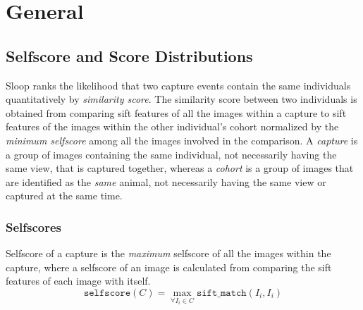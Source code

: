 \section{General}

\subsection{Selfscore and Score Distributions}

Sloop ranks the likelihood that two capture events contain the same individuals
quantitatively by \emph{similarity score}. The similarity score between two individuals is
obtained from comparing sift features of all the images within a capture to sift features of the images within the other individual's cohort
normalized by the \emph{minimum selfscore} among all the images involved in the
comparison. A \emph{capture} is a group of images containing the same individual, not
necessarily having the same view, that is captured together, whereas a \emph{cohort}
is a group of images that are identified as the \emph{same} animal, not necessarily
having the same view or captured at the same time.

\subsubsection{Selfscores}

Selfscore of a capture is the \emph{maximum} selfscore of all the images within
the capture, where a selfscore of an image is calculated from comparing the
sift features of each image with itself.  $$\texttt{selfscore}(C) =
\max_{\forall I_i \in C} \texttt{sift\_match}(I_i, I_i)$$ 

